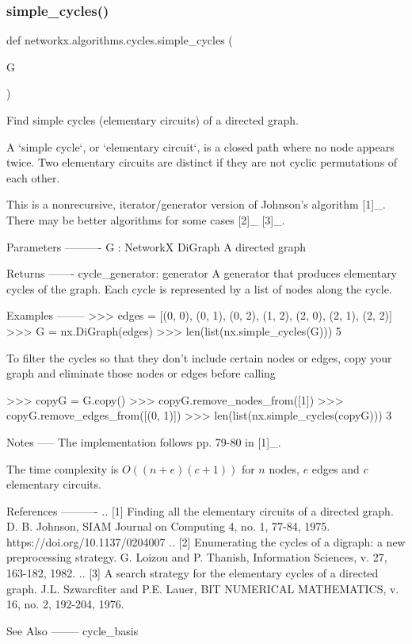 \subsubsection{\texorpdfstring{simple\+\_\+cycles()}{simple\_cycles()}}
{\footnotesize\ttfamily def networkx.\+algorithms.\+cycles.\+simple\+\_\+cycles (\begin{DoxyParamCaption}\item[{}]{G }\end{DoxyParamCaption})}

\begin{DoxyVerb}Find simple cycles (elementary circuits) of a directed graph.

A `simple cycle`, or `elementary circuit`, is a closed path where
no node appears twice. Two elementary circuits are distinct if they
are not cyclic permutations of each other.

This is a nonrecursive, iterator/generator version of Johnson's
algorithm [1]_.  There may be better algorithms for some cases [2]_ [3]_.

Parameters
----------
G : NetworkX DiGraph
   A directed graph

Returns
-------
cycle_generator: generator
   A generator that produces elementary cycles of the graph.
   Each cycle is represented by a list of nodes along the cycle.

Examples
--------
>>> edges = [(0, 0), (0, 1), (0, 2), (1, 2), (2, 0), (2, 1), (2, 2)]
>>> G = nx.DiGraph(edges)
>>> len(list(nx.simple_cycles(G)))
5

To filter the cycles so that they don't include certain nodes or edges,
copy your graph and eliminate those nodes or edges before calling

>>> copyG = G.copy()
>>> copyG.remove_nodes_from([1])
>>> copyG.remove_edges_from([(0, 1)])
>>> len(list(nx.simple_cycles(copyG)))
3


Notes
-----
The implementation follows pp. 79-80 in [1]_.

The time complexity is $O((n+e)(c+1))$ for $n$ nodes, $e$ edges and $c$
elementary circuits.

References
----------
.. [1] Finding all the elementary circuits of a directed graph.
   D. B. Johnson, SIAM Journal on Computing 4, no. 1, 77-84, 1975.
   https://doi.org/10.1137/0204007
.. [2] Enumerating the cycles of a digraph: a new preprocessing strategy.
   G. Loizou and P. Thanish, Information Sciences, v. 27, 163-182, 1982.
.. [3] A search strategy for the elementary cycles of a directed graph.
   J.L. Szwarcfiter and P.E. Lauer, BIT NUMERICAL MATHEMATICS,
   v. 16, no. 2, 192-204, 1976.

See Also
--------
cycle_basis
\end{DoxyVerb}
 